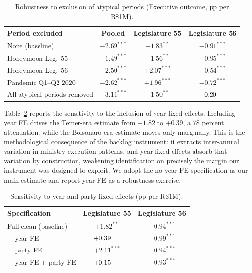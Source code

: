 \documentclass[preprint,12pt,authoryear]{elsarticle}
\begin{document}
\begin{table}[htbp]
\centering
\caption{Robustness to exclusion of atypical periods (Executive outcome, pp per R\$1M).}
\label{tab:atypical}
\begin{threeparttable}
\small
\begin{tabular}{lccc}
\toprule
Period excluded & Pooled & Legislature 55 & Legislature 56 \\
\midrule
None (baseline)              & $-2.69^{***}$ & $+1.83^{**}$  & $-0.91^{***}$ \\
Honeymoon Leg.~55             & $-1.49^{***}$ & $+1.56^{**}$  & $-0.95^{***}$ \\
Honeymoon Leg.~56             & $-2.50^{***}$ & $+2.07^{***}$ & $-0.54^{***}$ \\
Pandemic Q1--Q2 2020         & $-2.62^{***}$ & $+1.96^{***}$ & $-0.72^{***}$ \\
All atypical periods removed & $-3.11^{***}$ & $+1.50^{**}$  & $-0.20\hspace{1.4em}$ \\
\bottomrule
\end{tabular}
\end{threeparttable}
\end{table}

Table~\ref{tab:yearfe} reports the sensitivity to the inclusion of year fixed effects. Including year FE drives the Temer-era estimate from $+1.82$ to $+0.39$, a 78 percent attenuation, while the Bolsonaro-era estimate moves only marginally. This is the methodological consequence of the backlog instrument: it extracts inter-annual variation in ministry execution patterns, and year fixed effects absorb that variation by construction, weakening identification on precisely the margin our instrument was designed to exploit. We adopt the no-year-FE specification as our main estimate and report year-FE as a robustness exercise.

\begin{table}[htbp]
\centering
\caption{Sensitivity to year and party fixed effects (pp per R\$1M).}
\label{tab:yearfe}
\begin{threeparttable}
\small
\begin{tabular}{lcc}
\toprule
Specification & Legislature 55 & Legislature 56 \\
\midrule
Full-clean (baseline)                & $+1.82^{**}$  & $-0.94^{***}$ \\
\quad + year FE                      & $+0.39\hspace{1.4em}$ & $-0.99^{***}$ \\
\quad + party FE                     & $+2.11^{***}$ & $-0.94^{***}$ \\
\quad + year FE + party FE           & $+0.15\hspace{1.4em}$ & $-0.93^{***}$ \\
\bottomrule
\end{tabular}
\end{threeparttable}
\end{table}
\end{document}
